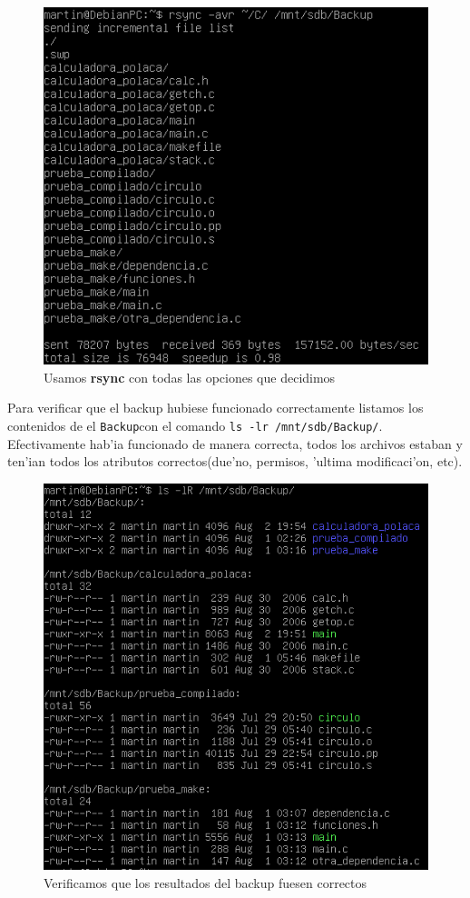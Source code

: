 \documentclass[11pt]{article}
\newcommand{\rsync}[0]{\textbf{rsync}}
\newcommand{\backup}[0]{\texttt{Backup}}
\begin{document}
		\begin{figure}[H]
			\centering
			\includegraphics[scale=0.7]{Images/rsync/rsync_backup_final.PNG}
			\caption{Usamos \rsync{} con todas las opciones que decidimos}
			\label{fig:rsync_backup_final}
		\end{figure}

		Para verificar que el backup hubiese funcionado correctamente listamos los contenidos de el \backup con el comando \texttt{ls -lr /mnt/sdb/Backup/}. Efectivamente hab'ia funcionado de manera correcta, todos los archivos estaban y ten'ian todos los atributos correctos(due'no, permisos, 'ultima modificaci'on, etc).

		\begin{figure}[H]
			\centering
			\includegraphics[scale=0.7]{Images/rsync/rsync_backup_final_result.PNG}
			\caption{Verificamos que los resultados del backup fuesen correctos}
			\label{fig:rsync_backup_final_result}
		\end{figure}
\end{document}
